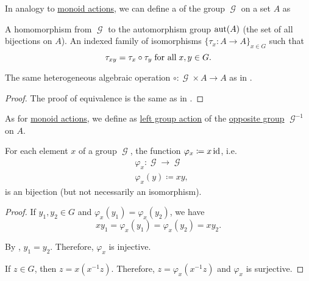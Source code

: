 \begin{definition}\label{def:left_group_action}
  In analogy to \hyperref[def:left_monoid_action]{monoid actions}, we can define a  of the group \( \mscrG \) on a set \( A \) as
  \begin{thmenum}
     A homomorphism from \( \mscrG \) to the automorphism group \( \operatorname{aut}(A) \) (the set of all bijections on \( A \)).
     An indexed family of isomorphisms \( \{ \tau_x: A \to A \}_{x \in G} \) such that
    \begin{equation}\label{eq:def:left_group_action/indirect_homomorphism}
      \tau_{xy} = \tau_x \circ \tau_y \T{for all} x, y \in G.
    \end{equation}

     The same heterogeneous algebraic operation \( \circ: \mscrG \times A \to A \) as in .
  \end{thmenum}
\end{definition}
\begin{proof}
  The proof of equivalence is the same as in .
\end{proof}

\begin{definition}\label{def:right_group_action}
  As for \hyperref[def:right_monoid_action]{monoid actions}, we define  as \hyperref[def:left_group_action]{left group action} of the \hyperref[def:magma/opposite]{opposite group} \( \mscrG^{-1} \) on \( A \).
\end{definition}

\begin{lemma}\label{thm:group_multiplication_is_bijection}
  For each element \( x \) of a group \( \mscrG \), the function \( \varphi_x \coloneqq x\operatorname{id} \), i.e.
  \begin{align*}
    &\varphi_x: \mscrG \to \mscrG \\
    &\varphi_x(y) \coloneqq xy,
  \end{align*}
  is an bijection (but not necessarily an isomorphism).
\end{lemma}
\begin{proof}
   If \( y_1, y_2 \in G \) and \( \varphi_x(y_1) = \varphi_x(y_2) \), we have
  \begin{equation*}
    xy_1 = \varphi_x(y_1) = \varphi_x(y_2) = xy_2.
  \end{equation*}

  By , \( y_1 = y_2 \). Therefore, \( \varphi_x \) is injective.

   If \( z \in G \), then \( z = x(x^{-1} z) \). Therefore, \( z = \varphi_x(x^{-1} z) \) and \( \varphi_x \) is surjective.
\end{proof}

